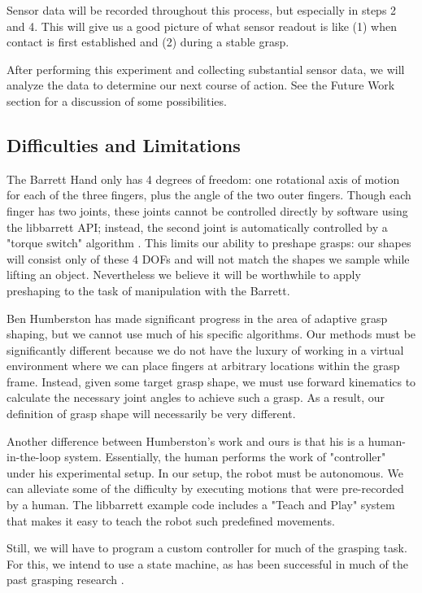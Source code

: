 Sensor data will be recorded throughout this process, but especially in steps 2 and 4. This will give us a good picture of what sensor readout is like (1) when contact is first established and (2) during a stable grasp.

After performing this experiment and collecting substantial sensor data, we will analyze the data to determine our next course of action. See the Future Work section for a discussion of some possibilities.

\subsection*{Difficulties and Limitations}

\quad The Barrett Hand only has 4 degrees of freedom: one rotational axis of motion for each of the three fingers, plus the angle of the two outer fingers. Though each finger has two joints, these joints cannot be controlled directly by software using the libbarrett API; instead, the second joint is automatically controlled by a "torque switch" algorithm \cite{manual} . This limits our ability to preshape grasps: our shapes will consist only of these 4 DOFs and will not match the shapes we sample while lifting an object. Nevertheless we believe it will be worthwhile to apply preshaping to the task of manipulation with the Barrett.

Ben Humberston has made significant progress in the area of adaptive grasp shaping, but we cannot use much of his specific algorithms. Our methods must be significantly different because we do not have the luxury of working in a virtual environment where we can place fingers at arbitrary locations within the grasp frame. Instead, given some target grasp shape, we must use forward kinematics to calculate the necessary joint angles to achieve such a grasp. As a result, our definition of grasp shape will necessarily be very different.

Another difference between Humberston's work and ours is that his is a human-in-the-loop system. Essentially, the human performs the work of "controller" under his experimental setup. In our setup, the robot must be autonomous. We can alleviate some of the difficulty by executing motions that were pre-recorded by a human. The libbarrett example code includes a "Teach and Play" system that makes it easy to teach the robot such predefined movements.

Still, we will have to program a custom controller for much of the grasping task. For this, we intend to use a state machine, as has been successful in much of the past grasping research \cite{Leoni} \cite{Sikka}.
